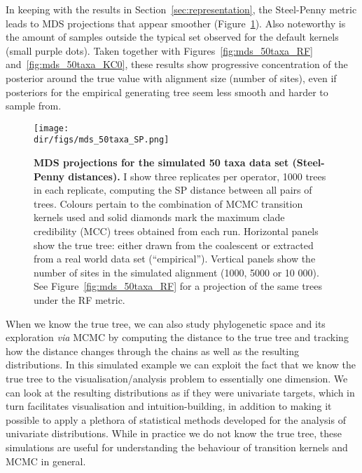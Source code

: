 In keeping with the results in Section~\ref{sec:representation}, the Steel-Penny metric leads to MDS projections that appear smoother (Figure~\ref{fig:mds_50taxa_SP}).
Also noteworthy is the amount of samples outside the typical set observed for the default kernels (small purple dots). 
Taken together with Figures~\ref{fig:mds_50taxa_RF} and~\ref{fig:mds_50taxa_KC0}, these results show progressive concentration of the posterior around the true value with alignment size (number of sites), even if posteriors for the empirical generating tree seem less smooth and harder to sample from.
\begin{figure}[!ht]
\begin{center}
\texttt{[image: \\dir/figs/mds\_50taxa\_SP.png]} 
\end{center}
 \caption[MDS projections for the simulated 50 taxa data set (Steel-Penny distances).]{\textbf{MDS projections for the simulated 50 taxa data set (Steel-Penny distances).}
 I show three replicates per operator, 1000 trees in each replicate, computing the SP distance between all pairs of trees.
 Colours pertain to the combination of MCMC transition kernels used and solid diamonds mark the maximum clade credibility (MCC) trees obtained from each run.
 Horizontal panels show the true tree: either drawn from the coalescent or extracted from a real world data set (``empirical'').
 Vertical panels show the number of sites in the simulated alignment (1000, 5000 or 10 000).
 See Figure~\ref{fig:mds_50taxa_RF} for a projection of the same trees under the RF metric.
 }
\label{fig:mds_50taxa_SP}
\end{figure}

When we know the true tree, we can also study phylogenetic space and its exploration \textit{via} MCMC by computing the distance to the true tree and tracking how the distance changes through the chains as well as the resulting distributions.
In this simulated example we can exploit the fact that we know the true tree to the visualisation/analysis problem to essentially one dimension.
We can look at the resulting distributions as if they were univariate targets, which in turn facilitates visualisation and intuition-building, in addition to making it possible to apply a plethora of statistical methods developed for the analysis of univariate distributions.
While in practice we do not know the true tree, these simulations are useful for understanding the behaviour of transition kernels and MCMC in general. 

